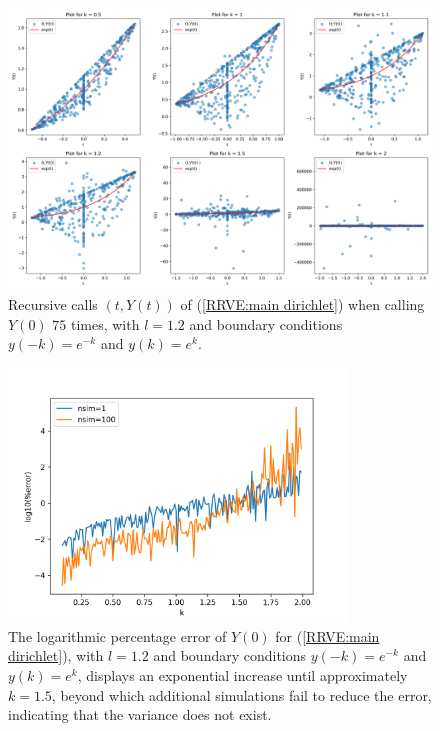 \documentclass[a4paper,12pt]{article}
\begin{document}
\begin{figure}[h!]
  \centering
  \includegraphics[width=\textwidth]{plots/main_dirichlet_viz.png}
  \caption{Recursive calls $(t,Y(t))$ of (\ref{RRVE:main dirichlet}) when
  calling $Y(0)$ $75$ times, with $l=1.2$ and boundary conditions
  $y(-k)=e^{-k}$ and $y(k)=e^{k}$.
  }
  \label{fig:plots/main_dirichlet_viz.png}
\end{figure}


\begin{figure}[h!]
  \centering
  \includegraphics[width=0.8\textwidth]{plots/main_dirichlet_convergence.png}
  \caption{The logarithmic percentage error of $Y(0)$ for
  (\ref{RRVE:main dirichlet}), with $l=1.2$ and boundary conditions
  $y(-k)=e^{-k}$ and $y(k)=e^{k}$, displays an exponential
  increase until approximately $k=1.5$, beyond which additional
  simulations fail to reduce the error, indicating that the variance
  does not exist.}
  \label{fig:mainD explosion}
\end{figure}
\end{document}
